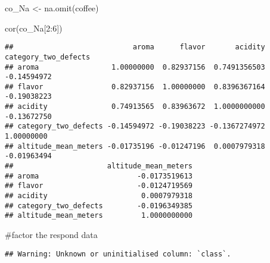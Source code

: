 \documentclass[
]{article}
\newenvironment{Shaded}{\begin{snugshade}}{\end{snugshade}}
\newcommand{\AttributeTok}[1]{\textcolor[rgb]{0.77,0.63,0.00}{#1}}
\newcommand{\DecValTok}[1]{\textcolor[rgb]{0.00,0.00,0.81}{#1}}
\newcommand{\FunctionTok}[1]{\textcolor[rgb]{0.00,0.00,0.00}{#1}}
\newcommand{\NormalTok}[1]{#1}
\newcommand{\OtherTok}[1]{\textcolor[rgb]{0.56,0.35,0.01}{#1}}
\newcommand{\SpecialCharTok}[1]{\textcolor[rgb]{0.00,0.00,0.00}{#1}}
\newcommand{\StringTok}[1]{\textcolor[rgb]{0.31,0.60,0.02}{#1}}
\begin{document}
\begin{Shaded}
\begin{Highlighting}[]
\NormalTok{co\_Na }\OtherTok{\textless{}{-}} \FunctionTok{na.omit}\NormalTok{(coffee)}
\end{Highlighting}
\end{Shaded}

\begin{Shaded}
\begin{Highlighting}[]
\FunctionTok{cor}\NormalTok{(co\_Na[}\DecValTok{2}\SpecialCharTok{:}\DecValTok{6}\NormalTok{])}
\end{Highlighting}
\end{Shaded}

\begin{verbatim}
##                            aroma      flavor       acidity category_two_defects
## aroma                 1.00000000  0.82937156  0.7491356503          -0.14594972
## flavor                0.82937156  1.00000000  0.8396367164          -0.19038223
## acidity               0.74913565  0.83963672  1.0000000000          -0.13672750
## category_two_defects -0.14594972 -0.19038223 -0.1367274972           1.00000000
## altitude_mean_meters -0.01735196 -0.01247196  0.0007979318          -0.01963494
##                      altitude_mean_meters
## aroma                       -0.0173519613
## flavor                      -0.0124719569
## acidity                      0.0007979318
## category_two_defects        -0.0196349385
## altitude_mean_meters         1.0000000000
\end{verbatim}

\#factor the respond data

\begin{Shaded}
\end{Shaded}

\begin{verbatim}
## Warning: Unknown or uninitialised column: `class`.
\end{verbatim}

\begin{Shaded}
\end{Shaded}
\end{document}
